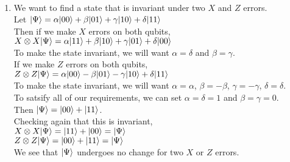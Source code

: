 \documentclass{assignment}
\begin{document}
\begin{problemlist}
  \pbitem
  \begin{problem}
  \end{problem}
  \begin{answer}
    \\
    \begin{enumerate}
    \item
      We want to find a state that is invariant under two $X$ and $Z$ errors.\\
      Let ${\left\vert{\Psi}\right\rangle} = \alpha{\left\vert{00}\right\rangle} + \beta{\left\vert{01}\right\rangle} + \gamma{\left\vert{10}\right\rangle} + \delta{\left\vert{11}\right\rangle}$\\
      Then if we make $X$ errors on both qubits,\\
      $X\otimes X{\left\vert{\Psi}\right\rangle}=\alpha{\left\vert{11}\right\rangle} + \beta{\left\vert{10}\right\rangle} + \gamma{\left\vert{01}\right\rangle} + \delta{\left\vert{00}\right\rangle}$\\
      To make the state invariant, we will want $\alpha = \delta$ and $\beta = \gamma$.\\
      If we make $Z$ errors on both qubits,\\
      $Z\otimes Z{\left\vert{\Psi}\right\rangle}=\alpha{\left\vert{00}\right\rangle} - \beta{\left\vert{01}\right\rangle} - \gamma{\left\vert{10}\right\rangle} + \delta{\left\vert{11}\right\rangle}$\\
      To make the state invariant, we will want $\alpha = \alpha$, $\beta = -\beta$, $\gamma = -\gamma$, $\delta = \delta$.\\
      To satsify all of our requirements, we can set $\alpha = \delta = 1$ and $\beta = \gamma = 0$.\\
      Then ${\left\vert{\Psi}\right\rangle} = {\left\vert{00}\right\rangle} + {\left\vert{11}\right\rangle}$.\\
      Checking again that this is invariant,\\
      $X\otimes X{\left\vert{\Psi}\right\rangle} = {\left\vert{11}\right\rangle} + {\left\vert{00}\right\rangle} = {\left\vert{\Psi}\right\rangle}$\\
      $Z\otimes Z{\left\vert{\Psi}\right\rangle} = {\left\vert{00}\right\rangle} + {\left\vert{11}\right\rangle} = {\left\vert{\Psi}\right\rangle}$\\
      We see that ${\left\vert{\Psi}\right\rangle}$ undergoes no change for two $X$ or $Z$ errors.
    \end{enumerate}
  \end{answer}


\end{problemlist}
\end{document}
